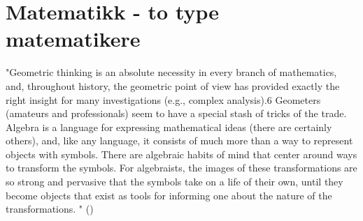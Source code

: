 \documentclass[12pt,twoside,onecolumn,norsk]{article}
\begin{document}
\section*{Matematikk - to type matematikere}
"Geometric thinking is an absolute necessity in every branch of mathematics, and,
throughout history, the geometric point of view has provided exactly the right
insight for many investigations (e.g., complex analysis).6 Geometers (amateurs
and professionals) seem to have a special stash of tricks of the trade. 
\newline
\newline
Algebra is a language for expressing mathematical ideas (there are certainly
others), and, like any language, it consists of much more than a way to represent
objects with symbols. There are algebraic habits of mind that center around ways
to transform the symbols. For algebraists, the images of these transformations
are so strong and pervasive that the symbols take on a life of their own, until they
become objects that exist as tools for informing one about the nature of the
transformations. " ()
\end{document}
